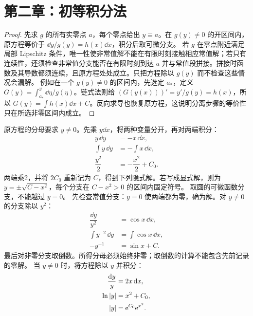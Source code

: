 \section{第二章：初等积分法}
\begin{proof}
先求 $g$ 的所有实零点 $a$，每个零点给出 $y\equiv a$。在 $g(y)\ne0$ 的开区间内，原方程等价于 $\dd y/g(y)=h(x)\dd x$，积分后取可微分支。
若 $g$ 在零点附近满足局部 Lipschitz 条件，唯一性使非常值解不能在有限时刻接触相应常值解；若只有连续性，还须检查非常值分支能否在有限时刻到达 $a$ 并与常值段拼接。拼接时函数及其导数都须连续，且原方程处处成立。只把方程除以 $g(y)$ 而不检查这些情况会漏解。
例如在一个 $g(y)\ne0$ 的区间内，先选定 $a_*$，定义 $\displaystyle G(y)=\int_{a_*}^y\dd\eta/g(\eta)$。链式法则给 $(G(y(x)))'=y'/g(y)=h(x)$，所以 $\displaystyle G(y)=\int h(x)\dd x+C$。反向求导也恢复原方程，这说明分离步骤的等价性只在所选非零区间内成立。
\end{proof}
原方程的分母要求 $y\ne0$。先乘 $y\dd x$，将两种变量分开，再对两端积分：
\[
\begin{aligned}
y\,\dd y&=-x\,\dd x,\\
\int y\,\dd y&=-\int x\,\dd x,\\
\dfrac{y^2}{2}&=-\dfrac{x^2}{2}+C_0.
\end{aligned}
\]
两端乘2，并将 $2C_0$ 重新记为 $C$，得到下列隐式解。若写成显式解，则为 $y=\pm\sqrt{C-x^2}$，每个分支在 $C-x^2>0$ 的区间内固定符号。
取圆的可微函数分支，不能越过 $y=0$。
先检查常值分支：$y=0$ 使两端都为零，确为解。对 $y\ne0$ 的分支除以 $y^2$：
\[
\begin{aligned}
\dfrac{\dd y}{y^2}&=\cos x\,\dd x,\\
\int y^{-2}\,\dd y&=\int\cos x\,\dd x,\\
-y^{-1}&=\sin x+C.
\end{aligned}
\]
最后对非零分支取倒数。所得分母必须始终非零；取倒数的计算不能包含先前记录的零解。
当 $y\ne0$ 时，将方程除以 $y$ 并积分：
\[
\begin{aligned}
\dfrac{\mathrm d y}{y}&=2x\,\mathrm d x,\\
\ln|y|&=x^2+C_0,\\
|y|&=\mathrm e^{C_0}\mathrm e^{x^2}.
\end{aligned}
\]
